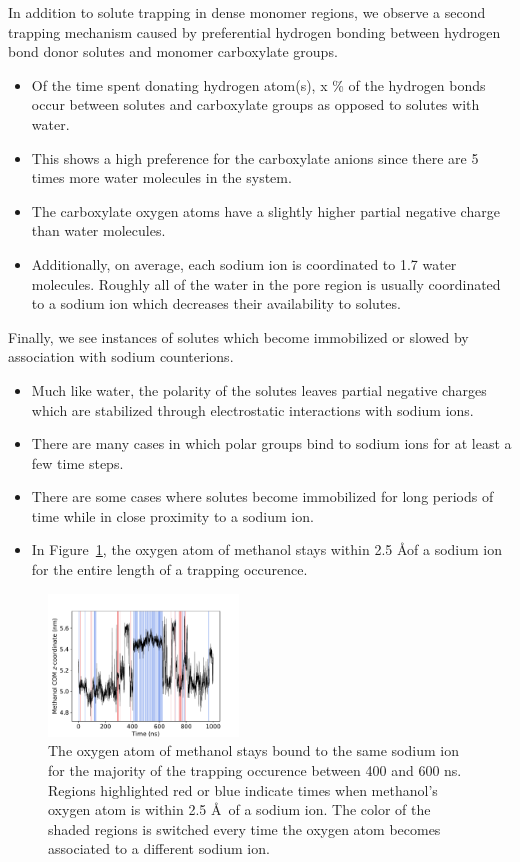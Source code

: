 \documentclass{article}
\begin{document}
  In addition to solute trapping in dense monomer regions, we observe a second
  trapping mechanism caused by preferential hydrogen bonding between 
  hydrogen bond donor solutes and monomer carboxylate groups. 
  \begin{itemize}
    \item Of the time spent donating hydrogen atom(s), x \% of the hydrogen
    bonds occur between solutes and carboxylate groups as opposed to solutes
    with water. 
    \item This shows a high preference for the carboxylate anions since there
    are 5 times more water molecules in the system.
    \item The carboxylate oxygen atoms have a slightly higher partial negative
    charge than water molecules.
    \item Additionally, on average, each sodium ion is coordinated to 1.7 water
    molecules. Roughly all of the water in the pore region is usually coordinated
    to a sodium ion which decreases their availability to solutes.
  \end{itemize}
  
  Finally, we see instances of solutes which become immobilized or slowed by 
  association with sodium counterions. 
  \begin{itemize}
    \item Much like water, the polarity of the solutes leaves partial negative
    charges which are stabilized through electrostatic interactions with sodium ions.
    \item There are many cases in which polar groups bind to sodium ions for at
    least a few time steps. 
    \item There are some cases where solutes become immobilized for long periods
    of time while in close proximity to a sodium ion.
    \item In Figure~\ref{fig:na_met_trace}, the oxygen atom of methanol stays
    within 2.5 \AA of a sodium ion for the entire length of a trapping occurence.
  \end{itemize}
  
  \begin{figure}[!htb]
  \centering
  \includegraphics[width=0.45\textwidth]{na_met_trace.pdf}
  \caption{The oxygen atom of methanol stays bound to the same sodium ion for
  the majority of the trapping occurence between 400 and 600 ns. Regions
  highlighted red or blue indicate times when methanol's oxygen atom is within 
  2.5 \AA~of a sodium ion. The color of the shaded regions is switched every time
  the oxygen atom becomes associated to a different sodium ion.}\label{fig:na_met_trace}
  \end{figure}
  	
\end{document}
